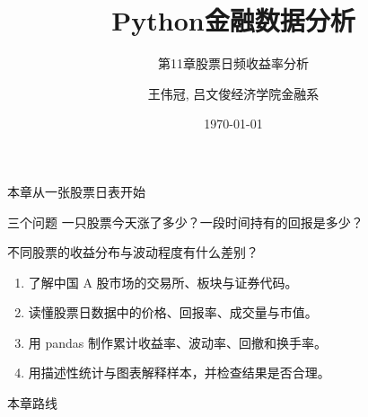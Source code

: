 \documentclass[9pt]{ctexbeamer}
\title[股票日频收益率分析]{Python金融数据分析}
\subtitle{第11章\quad 股票日频收益率分析}
\author[王伟冠, 吕文俊]{王伟冠, 吕文俊\quad 经济学院金融系}
\institute[SHU]{上海大学}
\date{\today}
\begin{document}
\begin{frame}\titlepage\end{frame}

\begin{frame}{本章从一张股票日表开始}
  \begin{block}{三个问题}
    一只股票今天涨了多少？\quad 一段时间持有的回报是多少？\par
    不同股票的收益分布与波动程度有什么差别？
  \end{block}
  \begin{enumerate}
    \item 了解中国 A 股市场的交易所、板块与证券代码。
    \item 读懂股票日数据中的价格、回报率、成交量与市值。
    \item 用 pandas 制作累计收益率、波动率、回撤和换手率。
    \item 用描述性统计与图表解释样本，并检查结果是否合理。
  \end{enumerate}
\end{frame}

\begin{frame}{本章路线}
  \tableofcontents
\end{frame}
\end{document}
